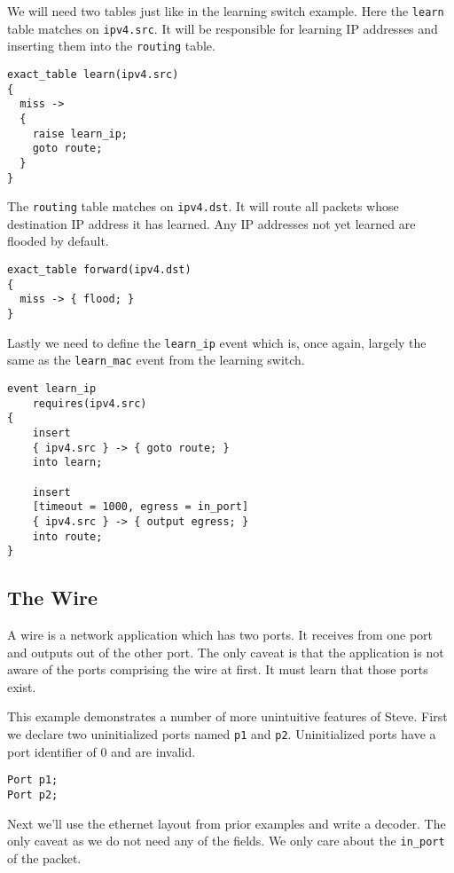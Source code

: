 We will need two tables just like in the learning switch example. Here the \texttt{learn} table matches on \texttt{ipv4.src}. It will be responsible for learning IP addresses and inserting them into the \texttt{routing} table.

\begin{lstlisting}
exact_table learn(ipv4.src)
{
  miss ->
  {
	raise learn_ip;
    goto route;
  }
}
\end{lstlisting}

The \texttt{routing} table matches on \texttt{ipv4.dst}. It will route all packets whose destination IP address it has learned. Any IP addresses not yet learned are flooded by default.

\begin{lstlisting}
exact_table forward(ipv4.dst)
{
  miss -> { flood; }
}
\end{lstlisting}

Lastly we need to define the \texttt{learn\_ip} event which is, once again, largely the same as the \texttt{learn\_mac} event from the learning switch.

\begin{lstlisting}
event learn_ip
	requires(ipv4.src)
{
	insert
	{ ipv4.src } -> { goto route; }
	into learn;

	insert
	[timeout = 1000, egress = in_port]
	{ ipv4.src } -> { output egress; }
	into route;
}
\end{lstlisting}

\subsection{The Wire} \label{wire}

A wire is a network application which has two ports. It receives from one port and outputs out of the other port. The only caveat is that the application is not aware of the ports comprising the wire at first. It must learn that those ports exist.

This example demonstrates a number of more unintuitive features of Steve. First we declare two uninitialized ports named \texttt{p1} and \texttt{p2}. Uninitialized ports have a port identifier of 0 and are invalid.

\begin{lstlisting}
Port p1;
Port p2;
\end{lstlisting}

Next we'll use the ethernet layout from prior examples and write a decoder. The only caveat as we do not need any of the fields. We only care about the \texttt{in\_port} of the packet.

